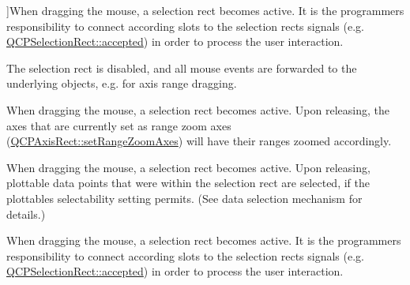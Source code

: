 \begin{Desc}
\begin{description}
{}]When dragging the mouse, a selection rect becomes active. It is the programmer\textquotesingle{}s responsibility to connect according slots to the selection rect\textquotesingle{}s signals (e.\+g. \hyperlink{class_q_c_p_selection_rect_a15a43542e1f7b953a44c260b419e6d2c}{Q\+C\+P\+Selection\+Rect\+::accepted}) in order to process the user interaction. \item[{\em 
srm\+None\hypertarget{namespace_q_c_p_ac9aa4d6d81ac76b094f9af9ad2d3aacfa894e973fdf7efc6174a9de50babb19fd}{}\label{namespace_q_c_p_ac9aa4d6d81ac76b094f9af9ad2d3aacfa894e973fdf7efc6174a9de50babb19fd}
}]The selection rect is disabled, and all mouse events are forwarded to the underlying objects, e.\+g. for axis range dragging. \item[{\em 
srm\+Zoom\hypertarget{namespace_q_c_p_ac9aa4d6d81ac76b094f9af9ad2d3aacfaaadea13ba6846072eb23d5f182be0fe3}{}\label{namespace_q_c_p_ac9aa4d6d81ac76b094f9af9ad2d3aacfaaadea13ba6846072eb23d5f182be0fe3}
}]When dragging the mouse, a selection rect becomes active. Upon releasing, the axes that are currently set as range zoom axes (\hyperlink{class_q_c_p_axis_rect_a9442cca2aa358405f39a64d51eca13d2}{Q\+C\+P\+Axis\+Rect\+::set\+Range\+Zoom\+Axes}) will have their ranges zoomed accordingly. \item[{\em 
srm\+Select\hypertarget{namespace_q_c_p_ac9aa4d6d81ac76b094f9af9ad2d3aacfa590be33019df7ba5276a8457a5c769c1}{}\label{namespace_q_c_p_ac9aa4d6d81ac76b094f9af9ad2d3aacfa590be33019df7ba5276a8457a5c769c1}
}]When dragging the mouse, a selection rect becomes active. Upon releasing, plottable data points that were within the selection rect are selected, if the plottable\textquotesingle{}s selectability setting permits. (See data selection mechanism for details.) \item[{\em 
srm\+Custom\hypertarget{namespace_q_c_p_ac9aa4d6d81ac76b094f9af9ad2d3aacfa88e34810ad5d2866d3857db386cbb442}{}\label{namespace_q_c_p_ac9aa4d6d81ac76b094f9af9ad2d3aacfa88e34810ad5d2866d3857db386cbb442}
}]When dragging the mouse, a selection rect becomes active. It is the programmer\textquotesingle{}s responsibility to connect according slots to the selection rect\textquotesingle{}s signals (e.\+g. \hyperlink{class_q_c_p_selection_rect_a15a43542e1f7b953a44c260b419e6d2c}{Q\+C\+P\+Selection\+Rect\+::accepted}) in order to process the user interaction. \end{description}
\end{Desc}
